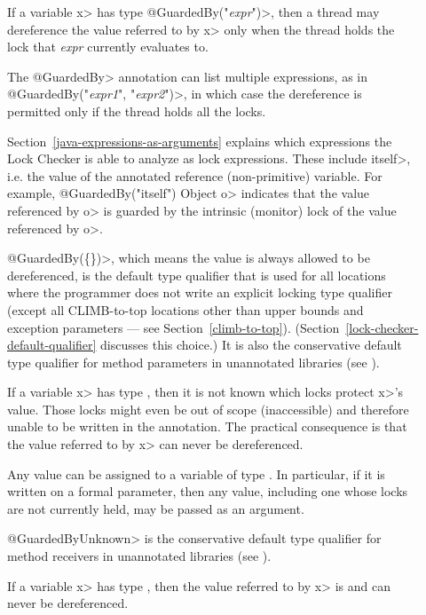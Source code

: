 \begin{description}

\item[]
  If a variable \<x> has type \<@GuardedBy("\emph{expr}")>, then a thread may
  dereference the value referred to by \<x> only when the thread holds the
  lock that \emph{expr} currently evaluates to.

  The \<@GuardedBy> annotation can list multiple expressions, as in
  \<@GuardedBy(\ttlcb"\emph{expr1}", "\emph{expr2}"\ttrcb)>, in which case
  the dereference is
  permitted only if the thread holds all the locks.

  Section~\ref{java-expressions-as-arguments} explains which
  expressions the Lock Checker is able to analyze as lock expressions.
  These include \<itself>, i.e. the value of the annotated reference
  (non-primitive) variable.  For example, \<@GuardedBy("itself") Object o>
  indicates that the value referenced by \<o> is guarded by the intrinsic
  (monitor) lock of the value referenced by \<o>.

  \<@GuardedBy(\{\})>, which means the value is always allowed to be
  dereferenced, is the default type qualifier that is used for all locations
  where the programmer does not
  write an explicit locking type qualifier (except all CLIMB-to-top locations
  other than upper bounds and exception parameters --- see Section~\ref{climb-to-top}).
  (Section~\ref{lock-checker-default-qualifier} discusses this choice.)
  It is also the conservative
  default type qualifier for method parameters in unannotated libraries
  (see ).

\item[]
  If a variable \<x> has type , then
  it is not known which locks protect \<x>'s value.  Those locks might
  even be out of scope (inaccessible) and therefore unable to be written
  in the annotation.
  The practical consequence is that
  the value referred to by \<x> can never be dereferenced.

  Any value can be assigned to a variable of type
  .  In particular, if it is written on a
  formal parameter, then any value,
  including one whose locks are not currently held,
  may be passed as an argument.

  \<@GuardedByUnknown> is the conservative
  default type qualifier for method receivers in unannotated libraries
  (see ).

\item[]
  If a variable \<x> has type , then
  the value referred to by \<x> is  and can never
  be dereferenced.

\end{description}

